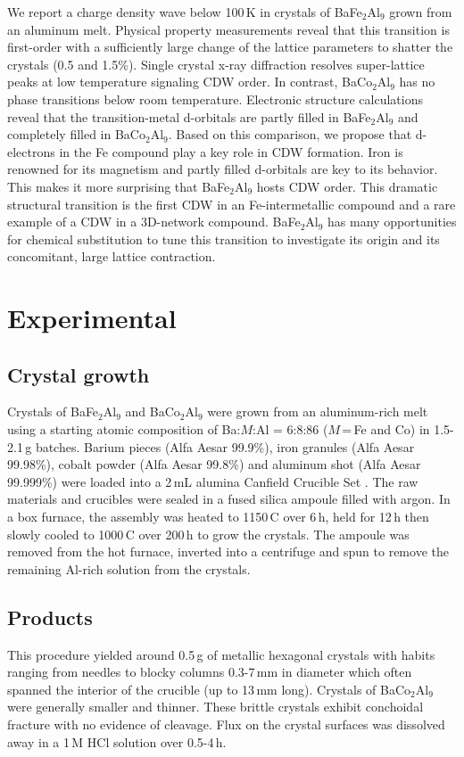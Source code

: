 \documentclass[journal=cmatex,manuscript=article]{achemso}
\begin{document}
We report a charge density wave below 100\,K in crystals of BaFe$_2$Al$_9$ grown from an aluminum melt. Physical property measurements reveal that this transition is first-order with a sufficiently large change of the lattice parameters to shatter the crystals (0.5 and 1.5\%). Single crystal x-ray diffraction resolves super-lattice peaks at low temperature signaling CDW order. In contrast, BaCo$_2$Al$_9$ has no phase transitions below room temperature. Electronic structure calculations reveal that the transition-metal d-orbitals are partly filled in BaFe$_2$Al$_9$ and completely filled in BaCo$_2$Al$_9$. Based on this comparison, we propose that d-electrons in the Fe compound play a key role in CDW formation. Iron is renowned for its magnetism and partly filled d-orbitals are key to its behavior. This makes it more surprising that BaFe$_2$Al$_9$ hosts CDW order. This dramatic structural transition is the first CDW in an Fe-intermetallic compound and a rare example of a CDW in a 3D-network compound. BaFe$_2$Al$_9$ has many opportunities for chemical substitution to tune this transition to investigate its origin and its concomitant, large lattice contraction.

\section{Experimental}
\label{sec:Experimental}

\subsection{Crystal growth}
\label{sec:Exp_growth}
Crystals of BaFe$_2$Al$_9$ and BaCo$_2$Al$_9$ were grown from an aluminum-rich melt using a starting atomic composition of Ba:$M$:Al = 6:8:86 ($M$\,=\,Fe and Co) in 1.5-2.1\,g batches. Barium pieces (Alfa Aesar 99.9\%), iron granules (Alfa Aesar 99.98\%), cobalt powder (Alfa Aesar 99.8\%) and aluminum shot (Alfa Aesar 99.999\%) were loaded into a 2\,mL alumina Canfield Crucible Set \cite{Canfield2016_CanfieldCrucibleSet}. The raw materials and crucibles were sealed in a fused silica ampoule filled with argon. In a box furnace, the assembly was heated to 1150\,\textdegree C over 6\,h, held for 12\,h then slowly cooled to 1000\,\textdegree C over 200\,h to grow the crystals. The ampoule was removed from the hot furnace, inverted into a centrifuge and spun to remove the remaining Al-rich solution from the crystals. 

\subsection{Products}
\label{sec:Exp_products}
This procedure yielded around 0.5\,g of metallic hexagonal crystals with habits ranging from needles to blocky columns 0.3-7\,mm in diameter which often spanned the interior of the crucible (up to 13\,mm long). Crystals of BaCo$_2$Al$_9$ were generally smaller and thinner. These brittle crystals exhibit conchoidal fracture with no evidence of cleavage. Flux on the crystal surfaces was dissolved away in a 1\,M HCl solution over 0.5-4\,h.
\end{document}

